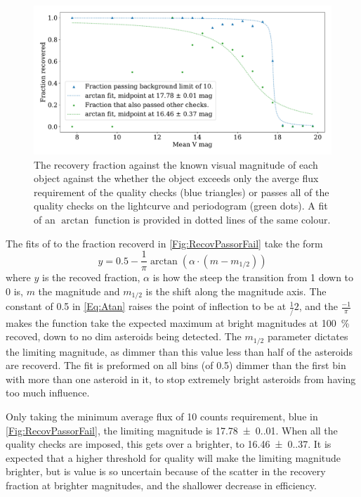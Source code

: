 \documentclass{UCreport}
\begin{document}
\begin{figure}
  \centering
  \includegraphics[width=\textwidth]{../OzData/recoverdHistBkgLimof10AtanBothLegendFixed.pdf}
  \caption[Recovery plot]{The recovery fraction against the known visual magnitude of each object against the whether the
    object exceeds only the averge flux requirement  of the quality checks (blue triangles) or passes all of the quality checks on the lightcurve and periodogram (green dots).
    A fit of an $\arctan$ function is provided in dotted lines of the same colour.
  }
  \label{Fig:RecovPassorFail}
\end{figure}


The fits of to the fraction recoverd in \autoref{Fig:RecovPassorFail} take the form
\begin{equation} \label{Eq:Atan}
  y= 0.5 -\frac{1}{\pi} \arctan(\alpha \cdot (m-m_{1/2}))
\end{equation}
where $y$ is the recoved fraction, $\alpha$ is how the steep the transition from 1 down to 0 is,  $m$ the magnitude and $m_{1/2}$ is the shift along the magnitude axis.
The constant of 0.5 in \autoref{Eq:Atan} raises the point of inflection to be at $\frac 1/2$, and the $\frac{-1}{\pi}$ makes the function take the expected maximum at bright magnitudes at \qty{100}{\percent} recoved, down to no dim asteroids being detected.
The $m_{1/2}$ parameter dictates the limiting magnitude, as dimmer than this value less than half of the asteroids are recoverd.
The fit is preformed on all bins (of \qty{0.5}{\mag}) dimmer than the first bin with more than one asteroid in it, to stop extremely bright asteroids from having too much influence.

Only taking the minimum average flux of 10 counts requirement, blue in \autoref{Fig:RecovPassorFail}, the limiting magnitude is \qty{17.78(0.01)}{\mag}.
When all the quality checks are imposed, this gets over a \unit{\mag} brighter, to \qty{16.46(0.37)}{\mag}.
It is expected that a higher threshold for quality will make the limiting magnitude brighter, but is value is so uncertain because of the scatter in the recovery fraction at brighter magnitudes, and the shallower decrease in efficiency.
\end{document}
